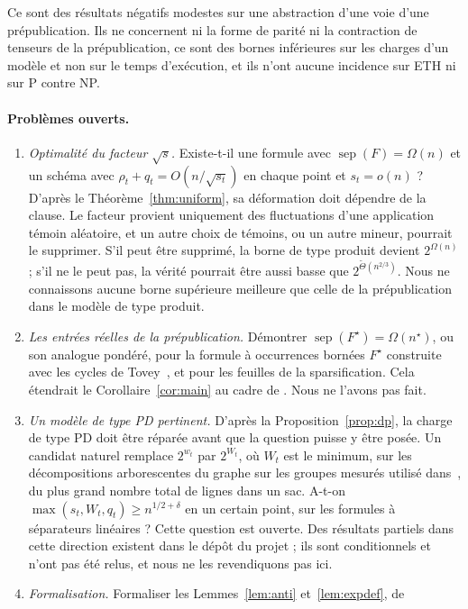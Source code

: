 \documentclass[11pt,a4paper]{article}
\theoremstyle{definition}
\theoremstyle{remark}
\newcommand{\sep}{\operatorname{sep}}
\begin{document}
Ce sont des résultats négatifs modestes sur une abstraction d'une voie d'une prépublication.
Ils ne concernent ni la forme de parité ni la contraction de tenseurs de la prépublication,
ce sont des bornes inférieures sur les charges d'un modèle et non sur le temps d'exécution,
et ils n'ont aucune incidence sur ETH ni sur P contre NP.

\paragraph{Problèmes ouverts.}
\begin{enumerate}
\item \emph{Optimalité du facteur $\sqrt s$.} Existe-t-il une formule avec
 $\sep(F)=\Omega(n)$ et un schéma avec $\rho_t+q_t=O(n/\sqrt{s_t})$ en chaque point et
 $s_t=o(n)$ ? D'après le Théorème~\ref{thm:uniform}, sa déformation doit dépendre de la
 clause. Le facteur provient uniquement des fluctuations d'une application témoin aléatoire,
 et un autre choix de témoins, ou un autre mineur, pourrait le supprimer. S'il peut être
 supprimé, la borne de type produit devient $2^{\Omega(n)}$ ; s'il ne le peut pas, la
 vérité pourrait être aussi basse que $2^{\tilde\Theta(n^{2/3})}$.
 Nous ne connaissons aucune borne supérieure meilleure que celle de la prépublication dans
 le modèle de type produit.
\item \emph{Les entrées réelles de la prépublication.} Démontrer
 $\sep(F^\star)=\Omega(n^\star)$, ou son analogue pondéré, pour la formule à occurrences
 bornées $F^\star$ construite avec les cycles de Tovey~\cite{Tov84}, et pour les feuilles de
 la sparsification. Cela étendrait le Corollaire~\ref{cor:main} au cadre de
 \cite[Théorème~8.3]{DL}. Nous ne l'avons pas fait.
\item \emph{Un modèle de type PD pertinent.} D'après la Proposition~\ref{prop:dp}, la charge
 de type PD doit être réparée avant que la question puisse y être posée. Un candidat naturel
 remplace $2^{w_t}$ par $2^{W_t}$, où $W_t$ est le minimum, sur les décompositions
 arborescentes du graphe sur les groupes mesurés utilisé dans~\cite{DL}, du plus grand
 nombre total de lignes dans un sac. A-t-on $\max(s_t,W_t,q_t)\ge n^{1/2+\delta}$ en un
 certain point, sur les formules à séparateurs linéaires ? Cette question est ouverte. Des
 résultats partiels dans cette direction existent dans le dépôt du projet ; ils sont
 conditionnels et n'ont pas été relus, et nous ne les revendiquons pas ici.
\item \emph{Formalisation.} Formaliser les Lemmes~\ref{lem:anti} et~\ref{lem:expdef}, de

\end{enumerate}
\end{document}
